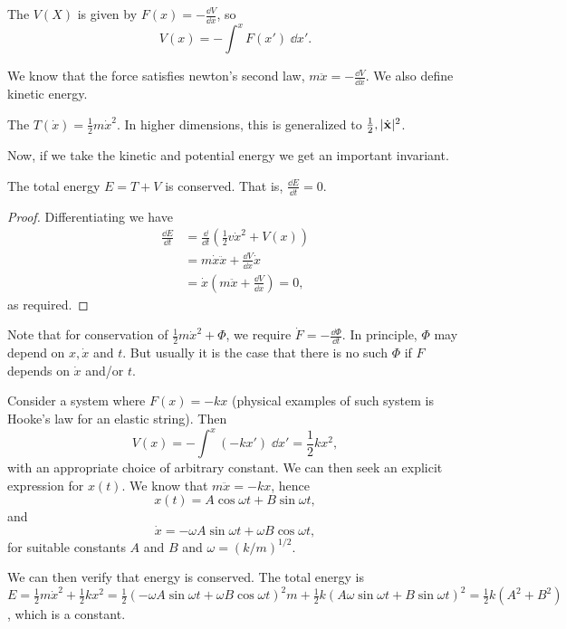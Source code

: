 \documentclass[a4paper]{scrreprt}
\begin{document}
\begin{definition}
	The  $V(X)$ is given by $F(x) = -\frac{\dd V}{\dd x}$, so
	$$
	V(x) = - \int^x F(x') \; \dd x'.
	$$
\end{definition}

We know that the force satisfies newton's second law, $m \ddot{x} = - \frac{\dd V}{\dd x}$. We also define kinetic energy.

\begin{definition}
	The  $T(\dot{x}) = \frac{1}{2} m\dot{x}^2$. In higher dimensions, this is generalized to $\frac{1}{2}, |\dot{\mathbf{x}}|^2$.
\end{definition}

Now, if we take the kinetic and potential energy we get an important invariant.

\begin{proposition}
	The total energy $E = T + V$ is conserved. That is, $\frac{\dd E}{\dd t} = 0$.
\end{proposition}
\begin{proof}
	Differentiating we have
	\begin{align*}
		\frac{\dd E}{\dd t} &= \frac{\dd}{\dd t} \left(\frac{1}{2} v \dot{x}^2 + V(x)\right) \\
		&= m \dot{x}\ddot{x} + \frac{\dd V}{\dd x} \dot{x} \\
		&= \dot{x} \left(m \ddot{x} + \frac{\dd V}{\dd x} \right) = 0,
	\end{align*}
	as required.
\end{proof}

Note that for conservation of $\frac{1}{2} m \dot{x}^2 + \Phi$, we require $\dot F = -\frac{\dd \Phi}{\dd t}$. In principle, $\Phi$ may depend on $x, \dot{x}$ and $t$. But usually it is the case that there is no such $\Phi$ if $F$ depends on $\dot{x}$ and/or $t$.

\begin{example}
	Consider a system where $F(x) = -k x$ (physical examples of such system is Hooke's law for an elastic string). Then
	$$
	V(x) = -\int^x (-kx') \; \dd x' = \frac{1}{2}k x^2,
	$$
	with an appropriate choice of arbitrary constant.
	We can then seek an explicit expression for $x(t).$ We know that $m \ddot{x} = -kx$, hence
	$$
x(t) = A \cos \omega t + B \sin \omega t,
	$$
	and
	$$
\dot{x} = - \omega A \sin \omega t + \omega B \cos \omega t,
$$
for suitable constants $A$ and $B$ and $\omega = (k/m)^{1/2}$.

We can then verify that energy is conserved. The total energy is $E = \frac{1}{2}m \dot{x}^2 + \frac{1}{2}kx^2 = \frac{1}{2}(-\omega A \sin \omega t + \omega B \cos \omega t)^2 m + \frac{1}{2}k (A \omega \sin \omega t + B 
\sin \omega t)^2 = \frac{1}{2}k(A^2 + B^2)$, which is a constant. 
\end{example}
\end{document}
